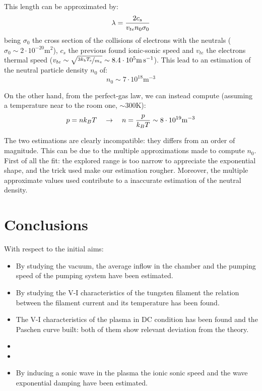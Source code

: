 \documentclass[11pt,a4 paper]{article}
\let\oldfrac\frac
\renewcommand{\frac}[3][d]{\ifthenelse{\equal{#1}{d}}{\oldfrac{#2}{#3}}{\nicefrac{#2}{#3}}}
\begin{document}
This length can be approximated by:
\begin{equation*}
  \lambda = \frac{2c_s}{v_{te}n_0\sigma_0}
\end{equation*}
being $\sigma_0$ the cross section of the collisions of electrons with the neutrals ($\sigma_0\sim2\cdot10^{-20}\si{\metre\squared}$), $c_s$ the previous found ionic-sonic speed and $v_{te}$ the electrons thermal speed ($v_{te}\sim\sqrt{\frac[f]{3k_bT_e}{m_e}}\sim8.4\cdot10^{5}\si{\metre\per\second}$). This lead to an estimation of the neutral particle density $n_0$ of:
\begin{equation*}
  n_0 \sim 7\cdot10^{18} \si{\metre^{-3}}
\end{equation*}

On the other hand, from the perfect-gas law, we can instead compute (assuming a temperature near to the room one, $\sim300\si{\kelvin}$):
\begin{equation*}
  p = nk_BT\quad\rightarrow\quad n = \frac{p}{k_BT} \sim 8\cdot10^{19} \si{\metre^{-3}}
\end{equation*}

The two estimations are clearly incompatible: they differs from an order of magnitude. This can be due to the multiple approximations made to compute $n_0$. First of all the fit: the explored range is too narrow to appreciate the exponential shape, and the trick used make our estimation rougher. Moreover, the multiple approximate values used contribute to a inaccurate estimation of the neutral density.

\section{Conclusions}
With respect to the initial aims:
\begin{itemize}
  \item By studying the vacuum, the average inflow in the chamber and the pumping speed of the pumping system have been estimated.
  \item By studying the V-I characteristics of the tungsten filament the relation between the filament current and its temperature has been found.
  \item The V-I characteristics of the plasma in DC condition has been found and the Paschen curve built: both of them show relevant deviation from the theory.
  \item {}
  \item {}
  \item By inducing a sonic wave in the plasma the ionic sonic speed and the wave exponential damping have been estimated.
\end{itemize}


\end{document}
